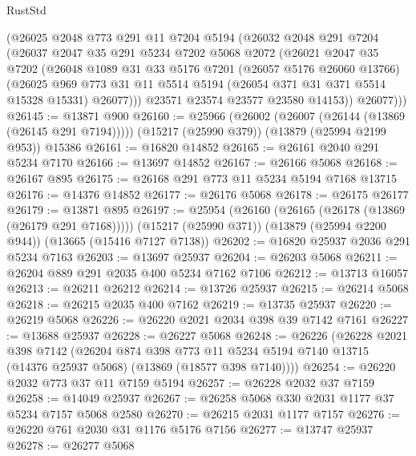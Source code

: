 \begin{lexlean}{RustStd}
\begin{coremodule}
        (@26025
          @2048
          @773
          @291
          @11
          @7204
          @5194
          (@26032
            @2048
            @291
            @7204
            (@26037
              @2047
              @35
              @291
              @5234
              @7202
              @5068
              @2072
              (@26021
                @2047
                @35
                @7202
                (@26048
                  @1089
                  @31
                  @33
                  @5176
                  @7201
                  (@26057 @5176 @26060 @13766)
                  (@26025
                    @969
                    @773
                    @31
                    @11
                    @5514
                    @5194
                    (@26054 @371 @31 @371 @5514 @15328 @15331)
                    @26077)))
              @23571
              @23574
              @23577
              @23580
              @14153))
          @26077)))
@26145 := @13871 @900
@26160 := @25966
    (@26002 (@26007 (@26144 (@13869 (@26145 @291 @7194)))))
    (@15217 (@25990 @379))
    (@13879 (@25994 @2199 @953))
    @15386
@26161 := @16820 @14852
@26165 := @26161 @2040 @291 @5234 @7170
@26166 := @13697 @14852
@26167 := @26166 @5068
@26168 := @26167 @895
@26175 := @26168 @291 @773 @11 @5234 @5194 @7168 @13715
@26176 := @14376 @14852
@26177 := @26176 @5068
@26178 := @26175 @26177
@26179 := @13871 @895
@26197 := @25954
    (@26160 (@26165 (@26178 (@13869 (@26179 @291 @7168)))))
    (@15217 (@25990 @371))
    (@13879 (@25994 @2200 @944))
    (@13665 (@15416 @7127 @7138))
@26202 := @16820 @25937 @2036 @291 @5234 @7163
@26203 := @13697 @25937
@26204 := @26203 @5068
@26211 := @26204 @889 @291 @2035 @400 @5234 @7162 @7106
@26212 := @13713 @16057
@26213 := @26211 @26212
@26214 := @13726 @25937
@26215 := @26214 @5068
@26218 := @26215 @2035 @400 @7162
@26219 := @13735 @25937
@26220 := @26219 @5068
@26226 := @26220 @2021 @2034 @398 @39 @7142 @7161
@26227 := @13688 @25937
@26228 := @26227 @5068
@26248 := @26226
    (@26228
      @2021
      @398
      @7142
      (@26204
        @874
        @398
        @773
        @11
        @5234
        @5194
        @7140
        @13715
        (@14376 @25937 @5068)
        (@13869 (@18577 @398 @7140))))
@26254 := @26220 @2032 @773 @37 @11 @7159 @5194
@26257 := @26228 @2032 @37 @7159
@26258 := @14049 @25937
@26267 := @26258 @5068 @330 @2031 @1177 @37 @5234 @7157 @5068 @2580
@26270 := @26215 @2031 @1177 @7157
@26276 := @26220 @761 @2030 @31 @1176 @5176 @7156
@26277 := @13747 @25937
@26278 := @26277 @5068

\end{coremodule}
\end{lexlean}
